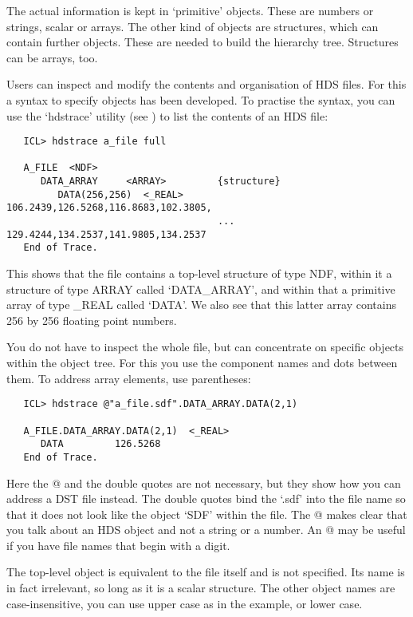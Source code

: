    The actual information is kept in `primitive' objects. These are
   numbers or strings, scalar or arrays. The other kind of objects are
   structures, which can contain further objects. These are needed to
   build the hierarchy tree. Structures can be arrays, too.

   Users can inspect and modify the contents and organisation of HDS
   files.  For this a syntax to specify objects has been developed.
   To practise the syntax, you can use the `hdstrace' utility (see
   ) to list the contents of an HDS file:

\begin{verbatim}
   ICL> hdstrace a_file full

   A_FILE  <NDF>
      DATA_ARRAY     <ARRAY>         {structure}
         DATA(256,256)  <_REAL>         106.2439,126.5268,116.8683,102.3805,
                                     ... 129.4244,134.2537,141.9805,134.2537
   End of Trace.
\end{verbatim}

   This shows that the file contains a top-level structure of
   type NDF, within it a structure of type ARRAY called `DATA\_ARRAY',
   and within that a primitive array of type \_REAL called `DATA'. We
   also see that this latter array contains 256 by 256 floating point
   numbers.

   You do not have to inspect the whole file, but can concentrate on
   specific objects within the object tree. For this you use the
   component names and dots between them. To address array elements,
   use parentheses:

\begin{verbatim}
   ICL> hdstrace @"a_file.sdf".DATA_ARRAY.DATA(2,1)

   A_FILE.DATA_ARRAY.DATA(2,1)  <_REAL>
      DATA         126.5268
   End of Trace.
\end{verbatim}

   Here the @ and the double quotes are not necessary, but they show
   how you can address a DST file instead. The double quotes bind the
   `.sdf' into the file name so that it does not look like the object
   `SDF' within the file. The @ makes clear that you talk about an HDS
   object and not a string or a number. An @ may be useful if you have
   file names that begin with a digit.

   The top-level object is equivalent to the file itself and is not
   specified. Its name is in fact irrelevant, so long as it is a
   scalar structure. The other object names are case-insensitive, you
   can use upper case as in the example, or lower case.

